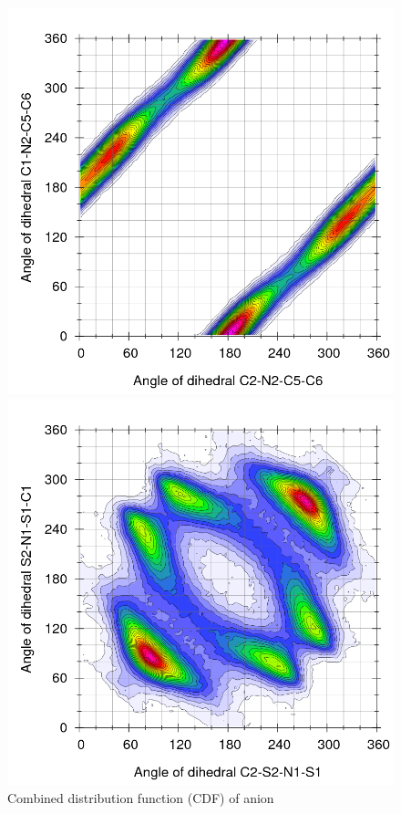 \documentclass[3p,twocolumn]{elsarticle}
\begin{document}
\begin{figure}[H]
\centering
  \includegraphics[width=\linewidth]{Ludwig.png}%

  \includegraphics[width=\linewidth]{Ludwig_anion.png}%
\caption{Combined distribution function (CDF) of anion}
\label{fig:dihedrals_anion}
\end{figure}
\end{document}
